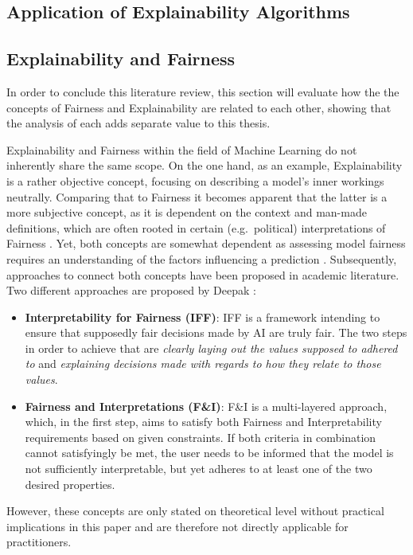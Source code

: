 
\subsection{Application of Explainability Algorithms}\label{subsec:application}


\subsection{Explainability and Fairness}\label{subsec:explainability_fairness}

In order to conclude this literature review, this section will evaluate how the the concepts of Fairness and Explainability are related to each other, showing that the analysis of each adds separate value to this thesis.

Explainability and Fairness within the field of Machine Learning do not inherently share the same scope. On the one hand, as an example, Explainability is a rather objective concept, focusing on describing a model's inner workings neutrally. 
Comparing that to Fairness it becomes apparent that the latter is a more subjective concept, as it is dependent on the context and man-made definitions, which are often rooted in certain (e.g.\ political) interpretations of Fairness \parencite{Deepak2021}.
Yet, both concepts are somewhat dependent as assessing model fairness requires an understanding of the factors influencing a prediction \parencite{Zhou2022}.
Subsequently, approaches to connect both concepts have been proposed in academic literature. Two different approaches are proposed by Deepak \parencite{Deepak2021}: 
\begin{itemize}
    \item \textbf{Interpretability for Fairness (IFF)}: IFF is a framework intending to ensure that supposedly fair decisions made by AI are truly fair. The two steps in order to achieve that are \textit{clearly laying out the values supposed to adhered to} and \textit{explaining decisions made with regards to how they relate to those values}.
    \item \textbf{Fairness and Interpretations (F\&I)}: F\&I is a multi-layered approach, which, in the first step, aims to satisfy both Fairness and Interpretability requirements based on given constraints. If both criteria in combination cannot satisfyingly be met, the user needs to be informed that the model is not sufficiently interpretable, but yet adheres to at least one of the two desired properties.
\end{itemize}
However, these concepts are only stated on theoretical level without practical implications in this paper and are therefore not directly applicable for practitioners.


